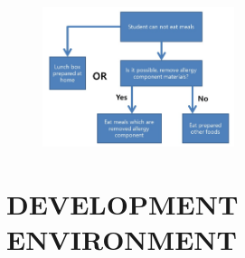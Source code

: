\documentclass[a4paper,11pt]{IEEEtran}
\begin{document}
{\begin{figure}[!h]
        \centering
        \includegraphics[width=0.5\textwidth, height=0.5\textheight]{s6.jpg}
        \caption{}
        \label{fig1}
\end{figure}
}
\newpage

\section{DEVELOPMENT ENVIRONMENT}
\end{document}
